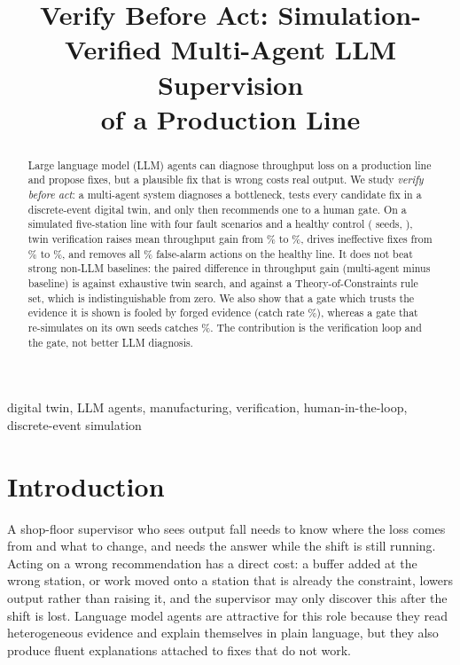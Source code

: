 \documentclass[conference]{IEEEtran}
\newcommand{\todo}[1]{{\color{red}\textbf{[TODO: #1]}}}
\begin{document}
\title{Verify Before Act: Simulation-Verified Multi-Agent LLM Supervision\\of a Production Line}

\author{
\IEEEauthorblockA{\todo{Affiliation}}}

\maketitle

\begin{abstract}
Large language model (LLM) agents can diagnose throughput loss on a production line and propose fixes,
but a plausible fix that is wrong costs real output. We study \emph{verify before act}: a multi-agent
system diagnoses a bottleneck, tests every candidate fix in a discrete-event digital twin, and only then
recommends one to a human gate. On a simulated five-station line with four fault scenarios and a healthy
control (\Nseeds{} seeds, \Model), twin verification raises mean throughput gain from \GainNoSim\% to
\GainMulti\%, drives ineffective fixes from \IneffNoSim\% to \IneffMulti\%, and removes all
\FalseAlarmNoSim\% false-alarm actions on the healthy line. It does not beat strong non-LLM baselines: the
paired difference in throughput gain (multi-agent minus baseline) is \DiffTwin{} against exhaustive twin
search, and \DiffToc{} against a Theory-of-Constraints rule set, which is indistinguishable from zero. We also show that a gate which trusts the evidence it is shown
is fooled by forged evidence (catch rate \CatchForgedTrustMulti\%), whereas a gate that re-simulates on its
own seeds catches \CatchForgedIndepMulti\%. The contribution is the verification loop and the gate, not
better LLM diagnosis.
\end{abstract}

\begin{IEEEkeywords}
digital twin, LLM agents, manufacturing, verification, human-in-the-loop, discrete-event simulation
\end{IEEEkeywords}

\section{Introduction}
A shop-floor supervisor who sees output fall needs to know where the loss comes from and what to change, and
needs the answer while the shift is still running. Acting on a wrong recommendation has a direct cost: a
buffer added at the wrong station, or work moved onto a station that is already the constraint, lowers
output rather than raising it, and the supervisor may only discover this after the shift is lost. Language
model agents are attractive for this role because they read heterogeneous evidence and explain themselves in
plain language, but they also produce fluent explanations attached to fixes that do not work.
\end{document}
